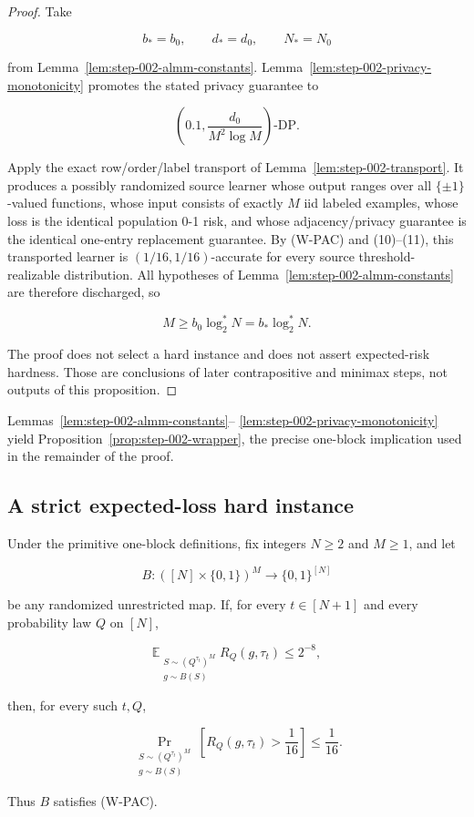 \begin{proof}
Take

\[
b_*=b_0,\qquad d_*=d_0,\qquad N_*=N_0
\]

from Lemma~\ref{lem:step-002-almm-constants}. Lemma~\ref{lem:step-002-privacy-monotonicity} promotes the stated privacy guarantee to

\[
\left(0.1,\frac{d_0}{M^2\log M}\right)\text{-DP}.
\]

Apply the exact row/order/label transport of Lemma~\ref{lem:step-002-transport}. It produces a possibly randomized source learner whose output ranges over all \(\{\pm1\}\)-valued functions, whose input consists of exactly \(M\) iid labeled examples, whose loss is the identical population 0-1 risk, and whose adjacency/privacy guarantee is the identical one-entry replacement guarantee. By (W-PAC) and (10)--(11), this transported learner is \((1/16,1/16)\)-accurate for every source threshold-realizable distribution. All hypotheses of Lemma~\ref{lem:step-002-almm-constants} are therefore discharged, so

\[
M\ge b_0\log_2^*N=b_*\log_2^*N.
\]

The proof does not select a hard instance and does not assert expected-risk hardness. Those are conclusions of later contrapositive and minimax steps, not outputs of this proposition. \end{proof}
Lemmas~\ref{lem:step-002-almm-constants}--
\ref{lem:step-002-privacy-monotonicity} yield
Proposition~\ref{prop:step-002-wrapper}, the precise one-block implication
used in the remainder of the proof.

\subsection{A strict expected-loss hard instance}\label{app:step-003}
\begin{lemma}\label{lem:step-003-markov-bridge}
Under the primitive one-block definitions, fix integers \(N\ge2\) and
\(M\ge1\), and let

\[
B:([N]\times\{0,1\})^M\to\{0,1\}^{[N]}
\]

be any randomized unrestricted map. If, for every \(t\in[N+1]\) and every
probability law \(Q\) on \([N]\),

\[
\mathbb E_{\substack{S\sim(Q^{\tau_t})^M\\g\sim B(S)}}
  R_Q(g,\tau_t)
\le 2^{-8},
\tag{1}
\]

then, for every such \(t,Q\),

\[
\Pr_{\substack{S\sim(Q^{\tau_t})^M\\g\sim B(S)}}
  \left[R_Q(g,\tau_t)>\frac1{16}\right]
\le\frac1{16}.
\tag{2}
\]

Thus \(B\) satisfies (W-PAC).
\end{lemma}

